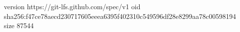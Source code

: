 version https://git-lfs.github.com/spec/v1
oid sha256:f47ce78aecd230717605eeea6395f402310c549596df28e8299aa78c00598194
size 87544
